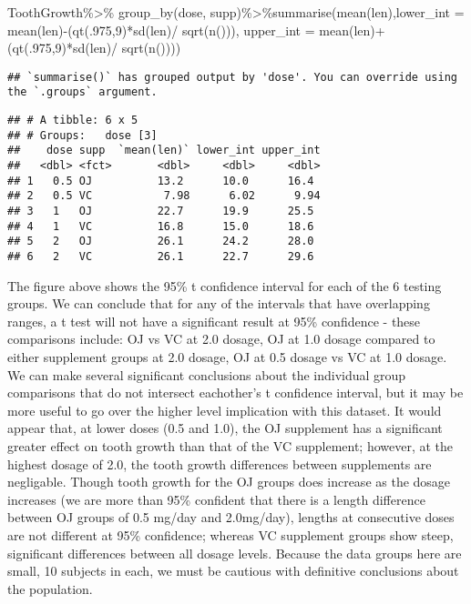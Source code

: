 \documentclass[
]{article}
\newenvironment{Shaded}{\begin{snugshade}}{\end{snugshade}}
\newcommand{\AttributeTok}[1]{\textcolor[rgb]{0.77,0.63,0.00}{#1}}
\newcommand{\DecValTok}[1]{\textcolor[rgb]{0.00,0.00,0.81}{#1}}
\newcommand{\FunctionTok}[1]{\textcolor[rgb]{0.00,0.00,0.00}{#1}}
\newcommand{\NormalTok}[1]{#1}
\newcommand{\SpecialCharTok}[1]{\textcolor[rgb]{0.00,0.00,0.00}{#1}}
\begin{document}
\begin{Shaded}
\begin{Highlighting}[]
\NormalTok{ToothGrowth}\SpecialCharTok{\%\textgreater{}\%} \FunctionTok{group\_by}\NormalTok{(dose, supp)}\SpecialCharTok{\%\textgreater{}\%}\FunctionTok{summarise}\NormalTok{(}\FunctionTok{mean}\NormalTok{(len),}\AttributeTok{lower\_int =} \FunctionTok{mean}\NormalTok{(len)}\SpecialCharTok{{-}}\NormalTok{(}\FunctionTok{qt}\NormalTok{(.}\DecValTok{975}\NormalTok{,}\DecValTok{9}\NormalTok{)}\SpecialCharTok{*}\FunctionTok{sd}\NormalTok{(len)}\SpecialCharTok{/} \FunctionTok{sqrt}\NormalTok{(}\FunctionTok{n}\NormalTok{())), }\AttributeTok{upper\_int =} \FunctionTok{mean}\NormalTok{(len)}\SpecialCharTok{+}\NormalTok{(}\FunctionTok{qt}\NormalTok{(.}\DecValTok{975}\NormalTok{,}\DecValTok{9}\NormalTok{)}\SpecialCharTok{*}\FunctionTok{sd}\NormalTok{(len)}\SpecialCharTok{/} \FunctionTok{sqrt}\NormalTok{(}\FunctionTok{n}\NormalTok{())))}
\end{Highlighting}
\end{Shaded}

\begin{verbatim}
## `summarise()` has grouped output by 'dose'. You can override using the `.groups` argument.
\end{verbatim}

\begin{verbatim}
## # A tibble: 6 x 5
## # Groups:   dose [3]
##    dose supp  `mean(len)` lower_int upper_int
##   <dbl> <fct>       <dbl>     <dbl>     <dbl>
## 1   0.5 OJ          13.2      10.0      16.4 
## 2   0.5 VC           7.98      6.02      9.94
## 3   1   OJ          22.7      19.9      25.5 
## 4   1   VC          16.8      15.0      18.6 
## 5   2   OJ          26.1      24.2      28.0 
## 6   2   VC          26.1      22.7      29.6
\end{verbatim}

The figure above shows the 95\% t confidence interval for each of the 6
testing groups. We can conclude that for any of the intervals that have
overlapping ranges, a t test will not have a significant result at 95\%
confidence - these comparisons include: OJ vs VC at 2.0 dosage, OJ at
1.0 dosage compared to either supplement groups at 2.0 dosage, OJ at 0.5
dosage vs VC at 1.0 dosage. We can make several significant conclusions
about the individual group comparisons that do not intersect eachother's
t confidence interval, but it may be more useful to go over the higher
level implication with this dataset. It would appear that, at lower
doses (0.5 and 1.0), the OJ supplement has a significant greater effect
on tooth growth than that of the VC supplement; however, at the highest
dosage of 2.0, the tooth growth differences between supplements are
negligable. Though tooth growth for the OJ groups does increase as the
dosage increases (we are more than 95\% confident that there is a length
difference between OJ groups of 0.5 mg/day and 2.0mg/day), lengths at
consecutive doses are not different at 95\% confidence; whereas VC
supplement groups show steep, significant differences between all dosage
levels. Because the data groups here are small, 10 subjects in each, we
must be cautious with definitive conclusions about the population.
\end{document}
